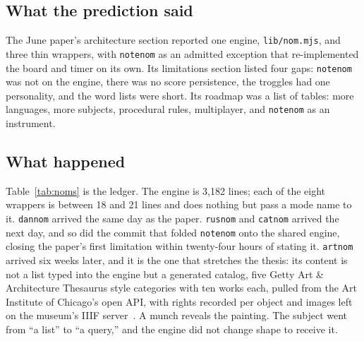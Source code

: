 \documentclass[10pt,letterpaper,twocolumn]{article}
\newcommand{\code}[1]{\texttt{#1}}
\newcommand{\term}[1]{``#1''}
\begin{document}
\subsection{What the prediction said}

The June paper's architecture section reported one engine, \code{lib/nom.mjs}, and three thin wrappers, with \code{notenom} as an admitted exception that re-implemented the board and timer on its own. Its limitations section listed four gaps: \code{notenom} was not on the engine, there was no score persistence, the troggles had one personality, and the word lists were short. Its roadmap was a list of tables: more languages, more subjects, procedural rules, multiplayer, and \code{notenom} as an instrument.

\subsection{What happened}

Table~\ref{tab:noms} is the ledger. The engine is 3,182 lines; each of the eight wrappers is between 18 and 21 lines and does nothing but pass a mode name to it. \code{dannom} arrived the same day as the paper. \code{rusnom} and \code{catnom} arrived the next day, and so did the commit that folded \code{notenom} onto the shared engine, closing the paper's first limitation within twenty-four hours of stating it. \code{artnom} arrived six weeks later, and it is the one that stretches the thesis: its content is not a list typed into the engine but a generated catalog, five Getty Art \& Architecture Thesaurus style categories with ten works each, pulled from the Art Institute of Chicago's open API, with rights recorded per object and images left on the museum's IIIF server~\citep{acrepo2026}. A munch reveals the painting. The subject went from \term{a list} to \term{a query,} and the engine did not change shape to receive it.
\end{document}
